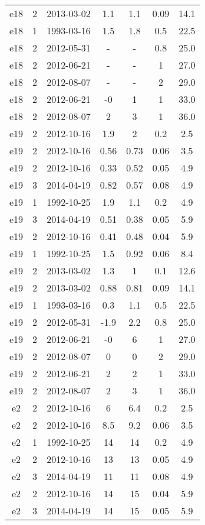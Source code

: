 \begin{longtable}{ccccccc}
e18 & 2 & 2013-03-02 & 1.1 & 1.1 & 0.09 & 14.1 \\
e18 & 1 & 1993-03-16 & 1.5 & 1.8 & 0.5 & 22.5 \\
e18 & 2 & 2012-05-31 & - & - & 0.8 & 25.0 \\
e18 & 2 & 2012-06-21 & - & - & 1 & 27.0 \\
e18 & 2 & 2012-08-07 & - & - & 2 & 29.0 \\
e18 & 2 & 2012-06-21 & -0 & 1 & 1 & 33.0 \\
e18 & 2 & 2012-08-07 & 2 & 3 & 1 & 36.0 \\
e19 & 2 & 2012-10-16 & 1.9 & 2 & 0.2 & 2.5 \\
e19 & 2 & 2012-10-16 & 0.56 & 0.73 & 0.06 & 3.5 \\
e19 & 2 & 2012-10-16 & 0.33 & 0.52 & 0.05 & 4.9 \\
e19 & 3 & 2014-04-19 & 0.82 & 0.57 & 0.08 & 4.9 \\
e19 & 1 & 1992-10-25 & 1.9 & 1.1 & 0.2 & 4.9 \\
e19 & 3 & 2014-04-19 & 0.51 & 0.38 & 0.05 & 5.9 \\
e19 & 2 & 2012-10-16 & 0.41 & 0.48 & 0.04 & 5.9 \\
e19 & 1 & 1992-10-25 & 1.5 & 0.92 & 0.06 & 8.4 \\
e19 & 2 & 2013-03-02 & 1.3 & 1 & 0.1 & 12.6 \\
e19 & 2 & 2013-03-02 & 0.88 & 0.81 & 0.09 & 14.1 \\
e19 & 1 & 1993-03-16 & 0.3 & 1.1 & 0.5 & 22.5 \\
e19 & 2 & 2012-05-31 & -1.9 & 2.2 & 0.8 & 25.0 \\
e19 & 2 & 2012-06-21 & -0 & 6 & 1 & 27.0 \\
e19 & 2 & 2012-08-07 & 0 & 0 & 2 & 29.0 \\
e19 & 2 & 2012-06-21 & 2 & 2 & 1 & 33.0 \\
e19 & 2 & 2012-08-07 & 2 & 3 & 1 & 36.0 \\
e2 & 2 & 2012-10-16 & 6 & 6.4 & 0.2 & 2.5 \\
e2 & 2 & 2012-10-16 & 8.5 & 9.2 & 0.06 & 3.5 \\
e2 & 1 & 1992-10-25 & 14 & 14 & 0.2 & 4.9 \\
e2 & 2 & 2012-10-16 & 13 & 13 & 0.05 & 4.9 \\
e2 & 3 & 2014-04-19 & 11 & 11 & 0.08 & 4.9 \\
e2 & 2 & 2012-10-16 & 14 & 15 & 0.04 & 5.9 \\
e2 & 3 & 2014-04-19 & 14 & 15 & 0.05 & 5.9 \\

\end{longtable}
